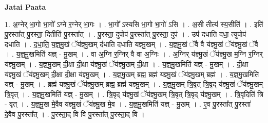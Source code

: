 \documentclass[17pt]{extarticle}
\begin{document}
\textbf{Jatai Paata} \newline

1. अ॒ग्नेर् भा॒गो भा॒गो᳚ ऽग्ने र॒ग्नेर् भा॒गः । . भा॒गो᳚ ऽस्यसि भा॒गो भा॒गो॑ ऽसि । . अ॒सी तीत्य॑ स्य॒सीति॑ । . इति॑ पु॒रस्ता᳚त् पु॒रस्ता॒ दितीति॑ पु॒रस्ता᳚त् । . पु॒रस्ता॒ दुपोप॑ पु॒रस्ता᳚त् पु॒रस्ता॒ दुप॑ । . उप॑ दधाति दधा॒ त्युपोप॑ दधाति । . द॒धा॒ति॒ य॒ज्ञ्॒मु॒खं ॅय॑ज्ञ्मु॒खम् द॑धाति दधाति यज्ञ्मु॒खम् । . य॒ज्ञ्॒मु॒खं ॅवै वै य॑ज्ञ्मु॒खं ॅय॑ज्ञ्मु॒खं ॅवै । . य॒ज्ञ्॒मु॒खमिति॑ यज्ञ् - मु॒खम् । . वा अ॒ग्नि र॒ग्निर् वै वा अ॒ग्निः । . अ॒ग्निर् य॑ज्ञ्मु॒खं ॅय॑ज्ञ्मु॒ख म॒ग्नि र॒ग्निर् य॑ज्ञ्मु॒खम् । . य॒ज्ञ्॒मु॒खम् दी॒क्षा दी॒क्षा य॑ज्ञ्मु॒खं ॅय॑ज्ञ्मु॒खम् दी॒क्षा । . य॒ज्ञ्॒मु॒खमिति॑ यज्ञ् - मु॒खम् । . दी॒क्षा य॑ज्ञ्मु॒खं ॅय॑ज्ञ्मु॒खम् दी॒क्षा दी॒क्षा य॑ज्ञ्मु॒खम् । . य॒ज्ञ्॒मु॒खम् ब्रह्म॒ ब्रह्म॑ यज्ञ्मु॒खं ॅय॑ज्ञ्मु॒खम् ब्रह्म॑ । . य॒ज्ञ्॒मु॒खमिति॑ यज्ञ् - मु॒खम् । . ब्रह्म॑ यज्ञ्मु॒खं ॅय॑ज्ञ्मु॒खम् ब्रह्म॒ ब्रह्म॑ यज्ञ्मु॒खम् । . य॒ज्ञ्॒मु॒खम् त्रि॒वृत् त्रि॒वृद् य॑ज्ञ्मु॒खं ॅय॑ज्ञ्मु॒खम् त्रि॒वृत् । . य॒ज्ञ्॒मु॒खमिति॑ यज्ञ् - मु॒खम् । . त्रि॒वृद् य॑ज्ञ्मु॒खं ॅय॑ज्ञ्मु॒खम् त्रि॒वृत् त्रि॒वृद् य॑ज्ञ्मु॒खम् । . त्रि॒वृदिति॑ त्रि - वृत् । . य॒ज्ञ्॒मु॒ख मे॒वैव य॑ज्ञ्मु॒खं ॅय॑ज्ञ्मु॒ख मे॒व । . य॒ज्ञ्॒मु॒खमिति॑ यज्ञ् - मु॒खम् । . ए॒व पु॒रस्ता᳚त् पु॒रस्ता॑ दे॒वैव पु॒रस्ता᳚त् । . पु॒रस्ता॒द् वि वि पु॒रस्ता᳚त् पु॒रस्ता॒द् वि । \newline
\end{document}
